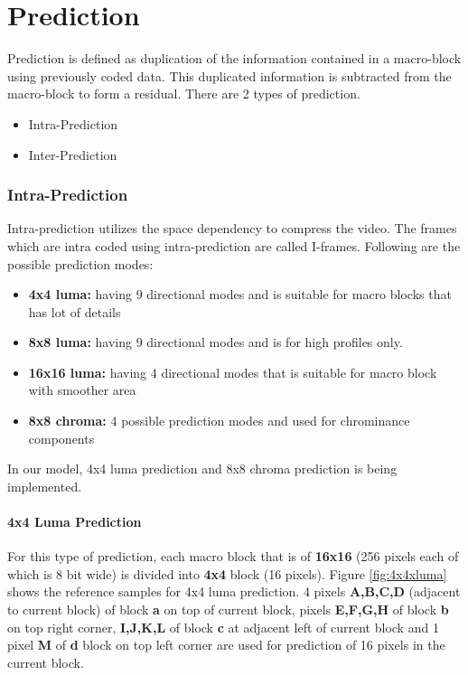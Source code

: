 
\chapter{Prediction} %
\label{Chapter3}

Prediction is defined as duplication of the information contained in a macro-block using previously coded data. This duplicated information is subtracted from the macro-block to form a residual. There are 2 types of prediction.

\begin{itemize}
	\item Intra-Prediction
	\item Inter-Prediction
\end{itemize}

\subsection{Intra-Prediction}
Intra-prediction utilizes the space dependency to compress the video. The frames which are intra coded using intra-prediction are called I-frames. Following are the possible prediction modes:
\begin{itemize}
	\item \textbf{4x4 luma:} having 9 directional modes and is suitable for macro blocks that has lot of details
	\item \textbf{8x8 luma:} having 9 directional modes and is for high profiles only.
	\item \textbf{16x16 luma:} having 4 directional modes that is suitable for macro block with smoother area
	\item \textbf{8x8 chroma:} 4 possible prediction modes and used for chrominance components
\end{itemize}
In our model, 4x4 luma prediction and 8x8 chroma prediction is being implemented.

\subsubsection{4x4 Luma Prediction}
For this type of prediction, each macro block that is of \textbf{16x16} (256 pixels each of which is 8 bit wide) is divided into \textbf{4x4} block (16 pixels). Figure \ref{fig:4x4xluma} shows the reference samples for 4x4 luma prediction. 4 pixels \textbf{A,B,C,D} (adjacent to current block) of block \textbf{a}  on top of current block, pixels \textbf{E,F,G,H} of block \textbf{b} on top right corner, \textbf{I,J,K,L} of block \textbf{c} at adjacent left of current block and 1 pixel \textbf{M} of \textbf{d} block on top left corner are used for prediction of 16 pixels in the current block.

